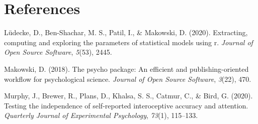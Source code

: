 \documentclass[
  man,floatsintext]{apa6}
\newlength{\cslhangindent}
\newlength{\cslentryspacingunit} %
\newenvironment{CSLReferences}[2] %
 {%
  \setlength{\parindent}{0pt}
  \ifodd #1
  \let\oldpar\par
  \def\par{\hangindent=\cslhangindent\oldpar}
  \fi
  \setlength{\parskip}{#2\cslentryspacingunit}
 }%
 {}
\begin{document}
\newpage

\hypertarget{references}{%
\section{References}\label{references}}

\hypertarget{refs}{}
\begin{CSLReferences}{1}{0}
\leavevmode{}%
Lüdecke, D., Ben-Shachar, M. S., Patil, I., \& Makowski, D. (2020). Extracting, computing and exploring the parameters of statistical models using r. \emph{Journal of Open Source Software}, \emph{5}(53), 2445.

\leavevmode{}%
Makowski, D. (2018). The psycho package: An efficient and publishing-oriented workflow for psychological science. \emph{Journal of Open Source Software}, \emph{3}(22), 470.

\leavevmode{}%
Murphy, J., Brewer, R., Plans, D., Khalsa, S. S., Catmur, C., \& Bird, G. (2020). Testing the independence of self-reported interoceptive accuracy and attention. \emph{Quarterly Journal of Experimental Psychology}, \emph{73}(1), 115--133.

\end{CSLReferences}


\clearpage
\renewcommand{\listfigurename}{Figure captions}
\end{document}
